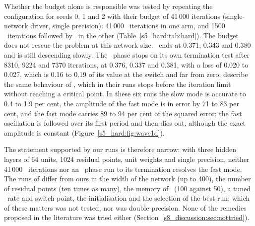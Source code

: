 Whether the budget alone is responsible was tested by repeating the 
configuration for seeds 0, 1 and 2 with their budget of 41\,000 iterations (single-network
driver, single precision): 41\,000 \Adam\ iterations in one arm, and 1500 \Adam\ iterations
followed by \LBFGS\ in the other (Table~\ref{s5_hard:tab:hard}). The budget does not rescue
the problem at this network size. \Adam\ ends at 0.371, 0.343 and 0.380 and is still
descending slowly. The \LBFGS\ phase stops on its own termination test after 8310, 9224 and
7370 iterations, at 0.376, 0.337 and 0.381, with a loss of 0.020 to 0.027, which is 0.16 to
0.19 of its value at the switch and far from zero; \citet{rathore2024} describe the same
behaviour of \LBFGS, which in their runs stops before the iteration limit without reaching a
critical point.
In these six runs the slow mode is accurate to 0.4 to 1.9 per cent, the amplitude of the fast
mode is in error by 71 to 83 per cent, and the fast mode carries 89 to 94 per cent of the
squared error: the fast oscillation is followed over its first period and then dies out,
although the exact amplitude is constant (Figure~\ref{s5_hard:fig:wave1d}).

The statement supported by our runs is therefore narrow: with three hidden layers of 64
units, 1024 residual points, unit weights and single precision, neither 41\,000 \Adam\
iterations nor an \LBFGS\ phase run to its termination resolves the fast mode.
The runs of \citet{rathore2024} differ from ours in the width of the network (up to 400), the
number of residual points (ten times as many), the memory of \LBFGS\ (100 against 50), a tuned
\Adam\ rate and switch point, the initialisation and the selection of the best run; which of
these matters was not tested, nor was double precision. None of the remedies proposed in the
literature was tried either (Section~\ref{s8_discussion:sec:nottried}).

